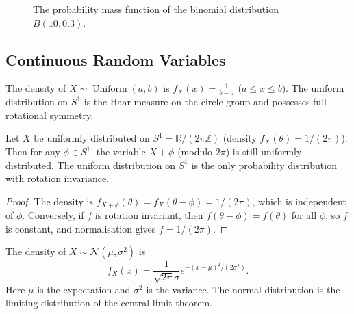 \begin{figure}[htbp]
\centering
{}
\caption{The probability mass function of the binomial distribution $B(10,0.3)$.}
\label{fig:binomial_pmf}
\end{figure}

\subsection{Continuous Random Variables}

\begin{definition}\label{def:uniform_distribution}
The density of $X \sim \operatorname{Uniform}(a, b)$ is $f_X(x) = \frac{1}{b-a}$ ($a \le x \le b$). The uniform distribution on $S^1$ is the Haar measure on the circle group and possesses full rotational symmetry.
\end{definition}

\begin{proposition}\label{prop:S1_uniform_rotation}
Let $X$ be uniformly distributed on $S^1 = \mathbb{R}/(2\pi\mathbb{Z})$ (density $f_X(\theta) = 1/(2\pi)$). Then for any $\phi \in S^1$, the variable $X + \phi$ (modulo $2\pi$) is still uniformly distributed. The uniform distribution on $S^1$ is the only probability distribution with rotation invariance.
\end{proposition}

\begin{proof}
The density is $f_{X+\phi}(\theta) = f_X(\theta - \phi) = 1/(2\pi)$, which is independent of $\phi$. Conversely, if $f$ is rotation invariant, then $f(\theta - \phi) = f(\theta)$ for all $\phi$, so $f$ is constant, and normalisation gives $f = 1/(2\pi)$.
\end{proof}

\begin{definition}\label{def:normal_distribution}
The density of $X \sim \mathcal{N}(\mu, \sigma^2)$ is
\[
f_X(x) = \frac{1}{\sqrt{2\pi}\sigma} e^{-(x-\mu)^2/(2\sigma^2)}.
\]
Here $\mu$ is the expectation and $\sigma^2$ is the variance. The normal distribution is the limiting distribution of the central limit theorem.
\end{definition}


